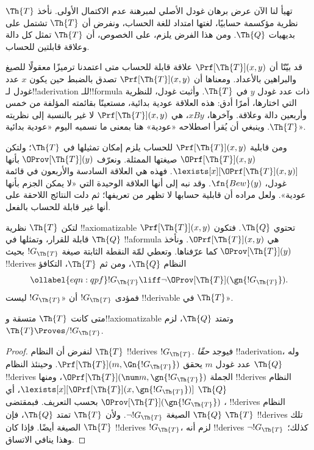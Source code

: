 \documentclass[../../../include/open-logic-section]{subfiles}
\begin{document}


تهيأ لنا الآن عرض برهان غودل الأصلي لمبرهنة عدم الاكتمال الأولى.
نأخذ $\Th{T}$ نظرية مؤكسمة حسابيًا، لغتها امتداد للغة الحساب،
ونفرض أن $\Th{T}$ تشتمل على بديهيات $\Th{Q}$. ومن هذا الفرض
يلزم، على الخصوص، أن $\Th{T}$ تمثل كل دالة وعلاقة قابلتين للحساب.

قد بيّنّا أن $\Prf[\Th{T}](x,y)$ علاقة قابلة للحساب متى اعتمدنا
ترميزًا معقولًا للصيغ والبراهين بالأعداد. ومعناها أن
$\Prf[\Th{T}](x,y)$ تصدق بالضبط حين يكون $x$ عدد غودل
لـ!!a{derivation} للـ!!{formula} ذات عدد غودل $y$ في
$\Th{T}$. وأثبت غودل، للنظرية التي اختارها، أمرًا أدق: هذه العلاقة
عودية بدائية، مستعينًا بقائمته المؤلفة من خمس وأربعين دالة وعلاقة.
وآخرها، $x B y$، هي $\Prf[\Th{T}](x,y)$ لا غير بالنسبة إلى
نظريته $\Th{T}$. وينبغي أن يُقرأ اصطلاحه «عودية» هنا بمعنى ما
نسميه اليوم «عودية بدائية».

ومن قابلية $\Prf[\Th{T}](x,y)$ للحساب يلزم إمكان تمثيلها في
$\Th{T}$؛ ولتكن $\OPrf[\Th{T}](x,y)$ صيغتها الممثلة.
ونعرّف $\OProv[\Th{T}](y)$ بأنها
$\lexists[x][\OPrf[\Th{T}](x,y)]$. فهذه هي العلاقة السادسة
والأربعون في قائمة غودل، $\fn{Bew}(y)$. وقد نبه إلى أنها العلاقة
الوحيدة التي «لا يمكن الجزم بأنها عودية». ولعل مراده أن قابلية
حسابها لا تظهر من تعريفها؛ ثم دلت النتائج اللاحقة على أنها
غير قابلة للحساب بالفعل.

لتكن $\Th{T}$ نظرية !!{axiomatizable} تحتوي $\Th{Q}$.
فتكون $\Prf[\Th{T}](x,y)$ قابلة للقرار، وتمثلها في $\Th{Q}$
!!a{formula} هي $\OPrf[\Th{T}](x,y)$. ونأخذ
$\OProv[\Th{T}](y)$ كما عرّفناها. وتعطي لمّة النقطة الثابتة صيغة
$!G_\Th{T}$ بحيث !!{derive}s النظام $\Th{Q}$، ومن ثم $\Th{T}$،
التكافؤ
\begin{equation}
\ollabel{eqn:qpf}
!G_\Th{T} \liff \lnot \OProv[\Th{T}](\gn{!G_\Th{T}}).
\end{equation}
فمؤدى $!G_\Th{T}$ أن «$!G_\Th{T}$ ليست !!{derivable} في
$\Th{T}$».

\begin{lem}
متى كانت $\Th{T}$ متسقة و!!{axiomatizable} وتمتد $\Th{Q}$،
لزم $\Th{T}\Proves/ !G_\Th{T}$.
\end{lem}

\begin{proof}
لنفرض أن النظام $\Th{T}$ !!{derive}s $!G_\Th{T}$.
فيوجد \emph{حقًا} !!a{derivation}، وله عدد غودل $m$ يحقق
$\Prf[\Th{T}](m,\Gn{!G_\Th{T}})$. وحينئذ النظام $\Th{Q}$
!!{derive}s الجملة $\OPrf[\Th{T}](\num m,\gn{!G_\Th{T}})$،
ومنها !!{derive}s النظام $\Th{Q}$
$\lexists[x][\OPrf[\Th{T}](x,\gn{!G_\Th{T}})]$،
أي $\OProv[\Th{T}](\gn{!G_\Th{T}})$ بحسب التعريف.
فبمقتضى ، !!{derive}s النظام $\Th{Q}$
الصيغة $\lnot !G_\Th{T}$. ولأن $\Th{T}$ تمتد $\Th{Q}$،
فإن $\Th{T}$ !!{derive}s تلك الصيغة أيضًا.
فإذا كان $\Th{T}$ !!{derive}s $!G_\Th{T}$، لزم أنه !!{derive}s
$\lnot !G_\Th{T}$ كذلك؛ وهذا ينافي الاتساق.
\end{proof}
\end{document}
